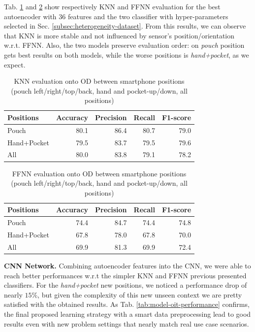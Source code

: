 Tab. \ref{tab:knn-metrics} and \ref{tab:ffnn-metrics} show
respectively KNN and FFNN evaluation for the best autoencoder with
$36$ features and the two classifier with hyper-parameters selected in
Sec. \ref{subsec:heterogeneity-dataset}. From this results, we can
observe that KNN is more stable and not influenced by sensor's
position/orientation w.r.t. FFNN. Also, the two models preserve
evaluation order: on \textit{pouch} position gets best results on both
models, while the worse positions is \textit{hand+pocket}, as we
expect.

\begin{table}[h]
  \centering
  \begin{tabular}{lrrrr}
    \hline
    Positions & Accuracy & Precision & Recall & F1-score \\
    \hline
    Pouch & 80.1 & 86.4 & 80.7 & 79.0 \\
    Hand+Pocket & 79.5 & 83.7 & 79.5 & 79.6 \\
    All & 80.0 & 83.8 & 79.1 & 78.2 \\
    \hline
  \end{tabular}
  \caption{KNN evaluation onto OD between smartphone positions (pouch
    left/right/top/back, hand and pocket-up/down, all positions)}
  \label{tab:knn-metrics}
\end{table}

\vspace{-0.25cm}

\begin{table}[h]
  \centering
  \begin{tabular}{lrrrr}
    \hline
    Positions & Accuracy & Precision & Recall & F1-score \\
    \hline
    Pouch & 74.4 & 84.7 & 74.4 & 74.8 \\
    Hand+Pocket & 67.8 & 78.0 & 67.8 & 70.0 \\
    All & 69.9 & 81.3 & 69.9 & 72.4 \\
    \hline
  \end{tabular}
  \caption{FFNN evaluation onto OD between smartphone positions (pouch
    left/right/top/back, hand and pocket-up/down, all positions)}
  \label{tab:ffnn-metrics}
\end{table}

\textbf{CNN Network.} Combining autoencoder features into the CNN, we were able to reach better performances w.r.t the simpler KNN and FFNN previous presented classifiers. For the \textit{hand+pocket} new positions, we noticed a performance drop of nearly $15\%$, but given the complexity of this new unseen context we are pretty satisfied with the obtained results. As
Tab. \ref{tab:model-oit-performance} confirms, the final proposed learning strategy with a smart data preprocessing lead to good results even with new problem
settings that nearly match real use case scenarios.

